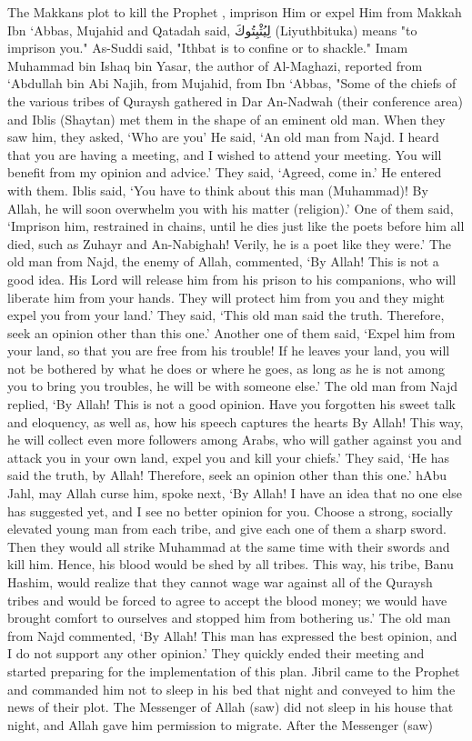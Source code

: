 \documentclass[11pt,a4paper,openany]{book}
\let\textAR\textarabic
\begin{document}
\begin{tafsirbox}
The Makkans plot to kill the Prophet , imprison Him or expel Him from Makkah Ibn `Abbas, Mujahid and Qatadah said, \textAR{لِيُثْبِتُوكَ} (Liyuthbituka) means "to imprison you." As-Suddi said, "Ithbat is to confine or to shackle." Imam Muhammad bin Ishaq bin Yasar, the author of Al-Maghazi, reported from `Abdullah bin Abi Najih, from Mujahid, from Ibn `Abbas, "Some of the chiefs of the various tribes of Quraysh gathered in Dar An-Nadwah (their conference area) and Iblis (Shaytan) met them in the shape of an eminent old man. When they saw him, they asked, `Who are you' He said, `An old man from Najd. I heard that you are having a meeting, and I wished to attend your meeting. You will benefit from my opinion and advice.' They said, `Agreed, come in.' He entered with them. Iblis said, `You have to think about this man (Muhammad)! By Allah, he will soon overwhelm you with his matter (religion).' One of them said, `Imprison him, restrained in chains, until he dies just like the poets before him all died, such as Zuhayr and An-Nabighah! Verily, he is a poet like they were.' The old man from Najd, the enemy of Allah, commented, `By Allah! This is not a good idea. His Lord will release him from his prison to his companions, who will liberate him from your hands. They will protect him from you and they might expel you from your land.' They said, `This old man said the truth. Therefore, seek an opinion other than this one.' Another one of them said, `Expel him from your land, so that you are free from his trouble! If he leaves your land, you will not be bothered by what he does or where he goes, as long as he is not among you to bring you troubles, he will be with someone else.' The old man from Najd replied, `By Allah! This is not a good opinion. Have you forgotten his sweet talk and eloquency, as well as, how his speech captures the hearts By Allah! This way, he will collect even more followers among Arabs, who will gather against you and attack you in your own land, expel you and kill your chiefs.' They said, `He has said the truth, by Allah! Therefore, seek an opinion other than this one.' hAbu Jahl, may Allah curse him, spoke next, `By Allah! I have an idea that no one else has suggested yet, and I see no better opinion for you. Choose a strong, socially elevated young man from each tribe, and give each one of them a sharp sword. Then they would all strike Muhammad at the same time with their swords and kill him. Hence, his blood would be shed by all tribes. This way, his tribe, Banu Hashim, would realize that they cannot wage war against all of the Quraysh tribes and would be forced to agree to accept the blood money; we would have brought comfort to ourselves and stopped him from bothering us.' The old man from Najd commented, `By Allah! This man has expressed the best opinion, and I do not support any other opinion.' They quickly ended their meeting and started preparing for the implementation of this plan. Jibril came to the Prophet and commanded him not to sleep in his bed that night and conveyed to him the news of their plot. The Messenger of Allah (saw) did not sleep in his house that night, and Allah gave him permission to migrate. After the Messenger (saw) 
\end{tafsirbox}
\end{document}
